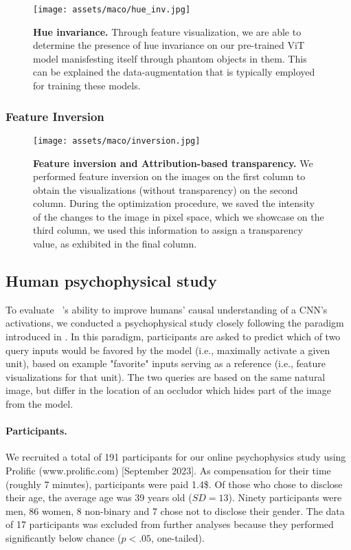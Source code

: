 \begin{figure}[ht]
    \centering
    \texttt{[image: assets/maco/hue\_inv.jpg]}
    \caption{\textbf{Hue invariance.} Through feature visualization, we are able to determine the presence of hue invariance on our pre-trained ViT model manisfesting itself through phantom objects in them. This can be explained the data-augmentation that is typically employed for training these models.}
    \label{fig:hue-inv}
\end{figure}

\subsubsection{Feature Inversion}\label{app:maco:inversion}

\begin{figure}[ht]
    \centering
    \texttt{[image: assets/maco/inversion.jpg]}
    \caption{\textbf{Feature inversion and Attribution-based transparency.} We performed feature inversion on the images on the first column to obtain the visualizations (without transparency) on the second column. During the optimization procedure, we saved the intensity of the changes to the image in pixel space, which we showcase on the third column, we used this information to assign a transparency value, as exhibited in the final column.}
    \label{fig:supp-inv}
\end{figure}

\subsection{Human psychophysical study}\label{sup:maco:psychophysics}

To evaluate \magfv~'s ability to improve humans' causal understanding of a CNN's activations, we conducted a psychophysical study closely following the paradigm introduced in \cite{zimmermann2021well}. In this paradigm, participants are asked to predict which of two query inputs would be favored by the model (i.e., maximally activate a given unit), based on example "favorite" inputs serving as a reference (i.e., feature visualizations for that unit). The two queries are based on the same natural image, but differ in the location of an occludor which hides part of the image from the model.

\paragraph{Participants.} We recruited a total of 191 participants for our online psychophysics study using Prolific (www.prolific.com) [September 2023]. As compensation for their time (roughly 7 minutes), participants were paid 1.4\$. Of those who chose to disclose their age, the average age was 39 years old ($SD = 13$). Ninety participants were men, 86 women, 8 non-binary and 7 chose not to disclose their gender. The data of 17 participants was excluded from further analyses because they performed significantly below chance ($p < .05$, one-tailed).

